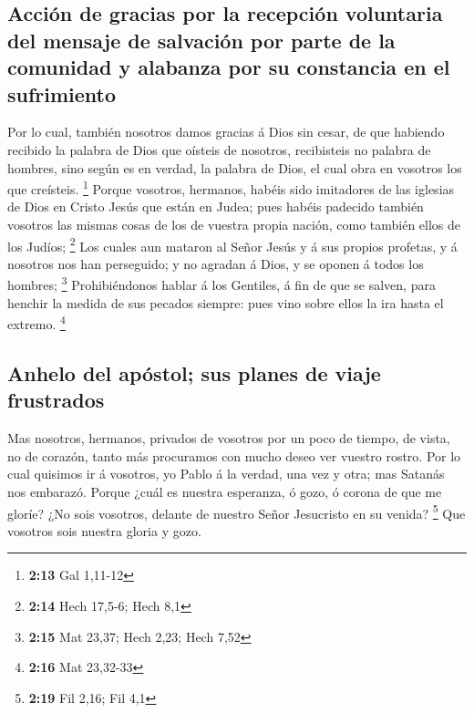 \hypertarget{acciuxf3n-de-gracias-por-la-recepciuxf3n-voluntaria-del-mensaje-de-salvaciuxf3n-por-parte-de-la-comunidad-y-alabanza-por-su-constancia-en-el-sufrimiento}{%
\subsection{Acción de gracias por la recepción voluntaria del mensaje de
salvación por parte de la comunidad y alabanza por su constancia en el
sufrimiento}\label{acciuxf3n-de-gracias-por-la-recepciuxf3n-voluntaria-del-mensaje-de-salvaciuxf3n-por-parte-de-la-comunidad-y-alabanza-por-su-constancia-en-el-sufrimiento}}

 Por lo cual, también nosotros damos gracias á Dios sin
cesar, de que habiendo recibido la palabra de Dios que oísteis de
nosotros, recibisteis no palabra de hombres, sino según es en verdad, la
palabra de Dios, el cual obra en vosotros los que creísteis. \footnote{\textbf{2:13}
  Gal 1,11-12}  Porque vosotros, hermanos, habéis sido
imitadores de las iglesias de Dios en Cristo Jesús que están en Judea;
pues habéis padecido también vosotros las mismas cosas de los de vuestra
propia nación, como también ellos de los Judíos; \footnote{\textbf{2:14}
  Hech 17,5-6; Hech 8,1}  Los cuales aun mataron al Señor
Jesús y á sus propios profetas, y á nosotros nos han perseguido; y no
agradan á Dios, y se oponen á todos los hombres; \footnote{\textbf{2:15}
  Mat 23,37; Hech 2,23; Hech 7,52}  Prohibiéndonos hablar á
los Gentiles, á fin de que se salven, para henchir la medida de sus
pecados siempre: pues vino sobre ellos la ira hasta el extremo.
\footnote{\textbf{2:16} Mat 23,32-33}

\hypertarget{anhelo-del-apuxf3stol-sus-planes-de-viaje-frustrados}{%
\subsection{Anhelo del apóstol; sus planes de viaje
frustrados}\label{anhelo-del-apuxf3stol-sus-planes-de-viaje-frustrados}}

 Mas nosotros, hermanos, privados de vosotros por un poco
de tiempo, de vista, no de corazón, tanto más procuramos con mucho deseo
ver vuestro rostro.  Por lo cual quisimos ir á vosotros, yo
Pablo á la verdad, una vez y otra; mas Satanás nos embarazó.
 Porque ¿cuál es nuestra esperanza, ó gozo, ó corona de que
me gloríe? ¿No sois vosotros, delante de nuestro Señor Jesucristo en su
venida? \footnote{\textbf{2:19} Fil 2,16; Fil 4,1}  Que
vosotros sois nuestra gloria y gozo.

